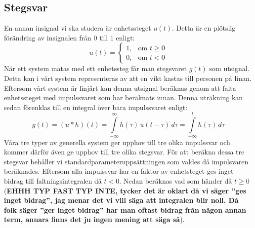 \subsection{Stegsvar}
En annan insignal vi ska studera är enhetssteget $u(t)$. Detta är en plötslig förändring av insignalen från $0$ till $1$ enligt:
$$u(t)=\begin{cases} 1, & \text{om } t \ge 0 \\ 0, & \text{om } t < 0\end{cases}$$
När ett system matas med ett enhetssteg får man stegsvaret $g(t)$ som utsignal. Detta kan i vårt system representeras av att en vikt kastas till personen på linan. Eftersom vårt system är linjärt kan denna utsignal beräknas genom att falta enhetssteget med impulssvaret som har beräknats innan. Denna uträkning kan sedan förenklas till en integral över bara impulssvaret enligt:
$$g(t)=(u*h)(t)=\int\limits_{-\infty}^{\infty}h(\tau)\,u(t-\tau)\,d\tau=\int\limits_{-\infty}^{t}h(\tau)\,d\tau$$
Våra tre typer av generella system ger upphov till tre olika impulssvar och kommer därför även ge upphov till tre olika stegsvar. För att beräkna dessa tre stegsvar behåller vi standardparameteruppsättningen som valdes då impulsvaren beräknades. Eftersom alla impulssvar har en faktor av enhetsteget ges inget bidrag till faltningsintegralen då $t < 0$. Nedan beräknas vad som händer då $t \ge 0$ (\textbf{EHHH TYP FAST TYP INTE, tycker det är oklart då vi säger ''ges inget bidrag'', jag menar det vi vill säga att integralen blir noll. Då folk säger ''ger inget bidrag'' har man oftast bidrag från någon annan term, annars finns det ju ingen mening att säga så}).

